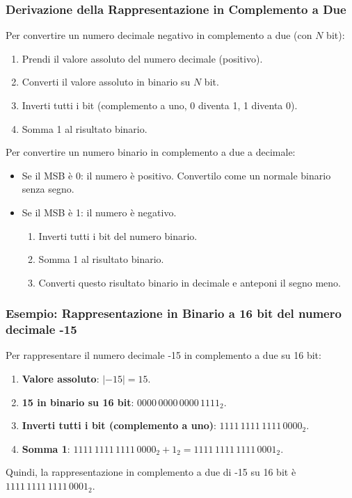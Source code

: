 \subsubsection{Derivazione della Rappresentazione in Complemento a Due}
Per convertire un numero decimale negativo in complemento a due (con $N$ bit):
\begin{enumerate}
    \item Prendi il valore assoluto del numero decimale (positivo).
    \item Converti il valore assoluto in binario su $N$ bit.
    \item Inverti tutti i bit (complemento a uno, 0 diventa 1, 1 diventa 0).
    \item Somma 1 al risultato binario.
\end{enumerate}
Per convertire un numero binario in complemento a due a decimale:
\begin{itemize}
    \item Se il MSB è 0: il numero è positivo. Convertilo come un normale binario senza segno.
    \item Se il MSB è 1: il numero è negativo.
    \begin{enumerate}
        \item Inverti tutti i bit del numero binario.
        \item Somma 1 al risultato binario.
        \item Converti questo risultato binario in decimale e anteponi il segno meno.
    \end{enumerate}
\end{itemize}

\subsubsection{Esempio: Rappresentazione in Binario a 16 bit del numero decimale -15}
Per rappresentare il numero decimale -15 in complemento a due su 16 bit:
\begin{enumerate}
    \item \textbf{Valore assoluto}: $|-15| = 15$.
    \item \textbf{15 in binario su 16 bit}: $0000\,0000\,0000\,1111_2$.
    \item \textbf{Inverti tutti i bit (complemento a uno)}: $1111\,1111\,1111\,0000_2$.
    \item \textbf{Somma 1}: $1111\,1111\,1111\,0000_2 + 1_2 = 1111\,1111\,1111\,0001_2$.
\end{enumerate}
Quindi, la rappresentazione in complemento a due di -15 su 16 bit è $1111\,1111\,1111\,0001_2$.

